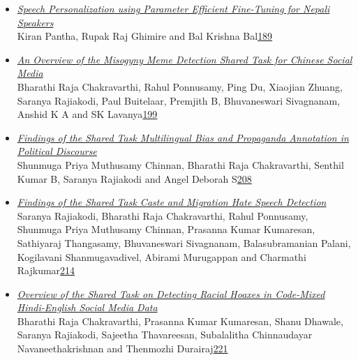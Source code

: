 \documentclass[11pt,oneside]{book}
\begin{document}
\begin{itemize}[leftmargin=*,label={}]
       \item \hyperlink{page.189}{\emph{Speech Personalization using Parameter Efficient Fine-Tuning for Nepali Speakers}}\\ \hspace*{2em} Kiran Pantha, Rupak Raj Ghimire and Bal Krishna Bal\dotfill \hyperlink{page.189}{189}
       \item \hyperlink{page.199}{\emph{An Overview of the Misogyny Meme Detection Shared Task for Chinese Social Media}}\\ \hspace*{2em} Bharathi Raja Chakravarthi, Rahul Ponnusamy, Ping Du, Xiaojian Zhuang, Saranya Rajiakodi, Paul Buitelaar, Premjith B, Bhuvaneswari Sivagnanam, Anshid K A and SK Lavanya\dotfill \hyperlink{page.199}{199}
       \item \hyperlink{page.208}{\emph{Findings of the Shared Task Multilingual Bias and Propaganda Annotation in Political Discourse}}\\ \hspace*{2em} Shunmuga Priya Muthusamy Chinnan, Bharathi Raja Chakravarthi, Senthil Kumar B, Saranya Rajiakodi and Angel Deborah S\dotfill \hyperlink{page.208}{208}
       \item \hyperlink{page.214}{\emph{Findings of the Shared Task Caste and Migration Hate Speech Detection}}\\ \hspace*{2em} Saranya Rajiakodi, Bharathi Raja Chakravarthi, Rahul Ponnusamy, Shunmuga Priya Muthusamy Chinnan, Prasanna Kumar Kumaresan, Sathiyaraj Thangasamy, Bhuvaneswari Sivagnanam, Balasubramanian Palani, Kogilavani Shanmugavadivel, Abirami Murugappan and Charmathi Rajkumar\dotfill \hyperlink{page.214}{214}
       \item \hyperlink{page.221}{\emph{Overview of the Shared Task on Detecting Racial Hoaxes in Code-Mixed Hindi-English Social Media Data}}\\ \hspace*{2em} Bharathi Raja Chakravarthi, Prasanna Kumar Kumaresan, Shanu Dhawale, Saranya Rajiakodi, Sajeetha Thavareesan, Subalalitha Chinnaudayar Navaneethakrishnan and Thenmozhi Durairaj\dotfill \hyperlink{page.221}{221}

\end{itemize}
\end{document}
